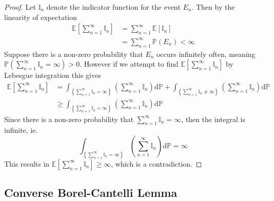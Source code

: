 \documentclass[11pt]{report} %
\begin{document}
\begin{proof}
Let $\mathbb{I}_{n}$ denote the indicator function for the event $E_{n}$. Then by the linearity of expectation
\begin{align}
\mathbb{E}\left[\sum_{n = 1}^{\infty}\mathbb{I}_{n}\right] &= \sum_{n = 1}^{\infty}\mathbb{E}\left[\mathbb{I}_{n}\right] \\
&= \sum_{n = 1}^{\infty}\mathbb{P}\left(E_{n}\right) < \infty
\end{align}
Suppose there is a non-zero probability that $E_{n}$ occurs infinitely often, meaning $\mathbb{P}\left(\sum_{n = 1}^{\infty}\mathbb{I}_{n} = \infty\right) > 0$. However if we attempt to find $\mathbb{E}\left[\sum_{n = 1}^{\infty}\mathbb{I}_{n}\right]$ by Lebesgue integration this gives
\begin{align}
\mathbb{E}\left[\sum_{n = 1}^{\infty}\mathbb{I}_{n}\right] &= \int_{\left\{\sum_{n = 1}^{\infty}\mathbb{I}_{n} = \infty\right\}}\left(\sum_{n = 1}^{\infty}\mathbb{I}_{n}\right)\mathrm{d}\mathbb{P} + \int_{\left\{\sum_{n = 1}^{\infty}\mathbb{I}_{n} \neq \infty\right\}}\left(\sum_{n = 1}^{\infty}\mathbb{I}_{n}\right)\mathrm{d}\mathbb{P} \\
&\geq \int_{\left\{\sum_{n = 1}^{\infty}\mathbb{I}_{n} = \infty\right\}}\left(\sum_{n = 1}^{\infty}\mathbb{I}_{n}\right)\mathrm{d}\mathbb{P}
\end{align}
Since there is a non-zero probability that $\sum_{n = 1}^{\infty}\mathbb{I}_{n} = \infty$, then the integral is infinite, ie.
\begin{equation}
\int_{\left\{\sum_{n = 1}^{\infty}\mathbb{I}_{n} = \infty\right\}}\left(\sum_{n = 1}^{\infty}\mathbb{I}_{n}\right)\mathrm{d}\mathbb{P} = \infty
\end{equation}
This results in $\mathbb{E}\left[\sum_{n = 1}^{\infty}\mathbb{I}_{n}\right] \geq \infty$, which is a contradiction.
\end{proof}

\subsection{Converse Borel-Cantelli Lemma}
\end{document}
